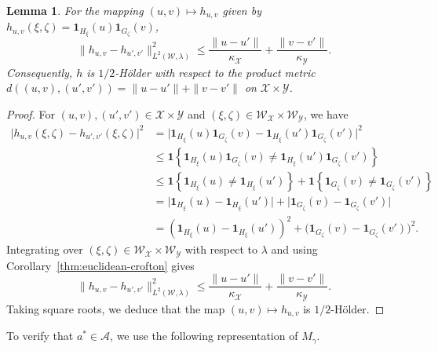 \documentclass[11pt]{amsart}
\newtheorem{lemma}[theorem]{Lemma}
\theoremstyle{definition}
\theoremstyle{remark}
\newcommand{\1}{\mathbf{1}}
\numberwithin{equation}{section}
\begin{document}
\begin{lemma}\label{lem:holder-smooth}
For the mapping $(u,v)\mapsto h_{u,v}$ given by
$h_{u,v}(\xi,\zeta)
=
\mathbf 1_{H_\xi}(u)\mathbf 1_{G_\zeta}(v)$,
\begin{equation*}
\|h_{u,v}-h_{u',v'}\|_{L^2(\mathcal W,\lambda)}^2
\leq
\frac{\|u-u'\|}{\kappa_{\mathcal X}}
+
\frac{\|v-v'\|}{\kappa_{\mathcal Y}}.
\end{equation*}
Consequently, $h$ is $1/2$-H\"older with respect to the product metric
$d((u,v),(u',v'))=\|u-u'\|+\|v-v'\|$ on
$\mathcal X\times\mathcal Y$.
\end{lemma}
\begin{proof}
    For $(u,v),(u',v')\in \mathcal X\times \mathcal Y$ and $(\xi,\zeta)\in \mathcal W_{\mathcal X}\times \mathcal W_{\mathcal Y}$, we have
\begin{align*}
\bigl|h_{u,v}(\xi,\zeta)-h_{u',v'}(\xi,\zeta)\bigr|^2
&=
\bigl|
\mathbf 1_{H_\xi}(u)\mathbf 1_{G_\zeta}(v)
-
\mathbf 1_{H_\xi}(u')\mathbf 1_{G_\zeta}(v')
\bigr|^2 \\
&\leq
\mathbf 1\!\left\{
\mathbf 1_{H_\xi}(u)\mathbf 1_{G_\zeta}(v)
\neq
\mathbf 1_{H_\xi}(u')\mathbf 1_{G_\zeta}(v')
\right\} \\
&\leq
\mathbf 1\!\left\{
\mathbf 1_{H_\xi}(u)\neq \mathbf 1_{H_\xi}(u')
\right\}
+
\mathbf 1\!\left\{
\mathbf 1_{G_\zeta}(v)\neq \mathbf 1_{G_\zeta}(v')
\right\} \\
&=
\bigl|\mathbf 1_{H_\xi}(u)-\mathbf 1_{H_\xi}(u')\bigr|
+
\bigl|\mathbf 1_{G_\zeta}(v)-\mathbf 1_{G_\zeta}(v')\bigr| \\
&= (\mathbf 1_{H_\xi}(u)-\mathbf 1_{H_\xi}(u'))^2
+
\bigl(\mathbf 1_{G_\zeta}(v)-\mathbf 1_{G_\zeta}(v')\bigr)^2.
\end{align*}
Integrating over $(\xi, \zeta) \in \mathcal W_{\mathcal X} \times \mathcal W_{\mathcal Y}$ with respect to $\lambda$ and using Corollary~\ref{thm:euclidean-crofton} gives
\begin{equation*}
\|h_{u,v}-h_{u',v'}\|_{L^2(\mathcal{W},\lambda)}^2
\le \frac{\|u-u'\|}{\kappa_{\mathcal X}}+\frac{\|v-v'\|}{\kappa_{\mathcal Y}}.
\end{equation*}
Taking square roots, we deduce that the map $(u,v)\mapsto h_{u,v}$ is $1/2$-H\"older. 
\end{proof}
To verify that
$a^*\in\mathcal A$, we use the following representation of $M_\gamma$.
\end{document}
